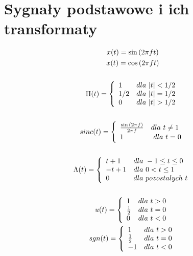 \section{Sygnały podstawowe i ich transformaty}
    \begin{multicols}{2}
        \begin{gather*}
            x(t) = \sin{(2\pi ft)}\\
            x(t) = \cos{(2\pi ft)}\\
\\%
            \Pi(t) = \left\{\begin{array}{l l}
                1 & dla\ |t| < 1/2\\
                1/2 & dla\ |t| = 1/2\\
                0 & dla\ |t| > 1/2
            \end{array} \right.\\
\\%
            sinc(t) = \left\{\begin{array}{l l}
                \frac{\sin{(2\pi f)}}{2\pi f} & dla\ t \neq 1\\
                1 &\ dla\ t = 0
            \end{array}\right.\\
\\%
            \Lambda(t) = \left\{\begin{array}{l l}
                t+1 & dla\ -1 \leq t \leq 0\\
                -t+1 & dla\ 0 < t \leq 1\\
                0 & dla\ pozostalych\ t
            \end{array}\right.\\
\\%
            u(t) = \left\{\begin{array}{l l}
                1 & dla\ t>0\\
                \frac{1}{2} & dla\ t=0\\
                0 & dla\ t <0
            \end{array}\right.
\\%
            sgn(t) = \left\{\begin{array}{l l}
                1 & dla\ t>0\\
                \frac{1}{2} & dla\ t=0\\
                -1 & dla\ t <0
            \end{array}\right.
        \end{gather*}



\end{multicols}
